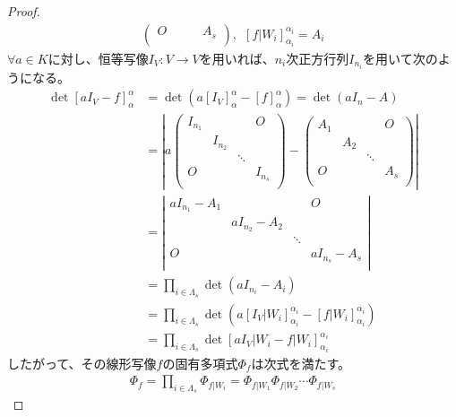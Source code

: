 \documentclass[dvipdfmx]{jsarticle}
\begin{document}
\begin{proof}
\begin{align*}
\begin{pmatrix}
O & \  & \  & A_{s} \\
\end{pmatrix},\ \ \left[ f|W_{i} \right]_{\alpha_{i}}^{\alpha_{i}} = A_{i}
\end{align*}
$\forall a \in K$に対し、恒等写像$I_{V}:V \rightarrow V$を用いれば、$n_{i}$次正方行列$I_{n_{i}}$を用いて次のようになる。
\begin{align*}
\det\left[ aI_{V} - f \right]_{\alpha}^{\alpha} &= \det\left( a\left[ I_{V} \right]_{\alpha}^{\alpha} - [ f]_{\alpha}^{\alpha} \right) = \det\left( aI_{n} - A \right)\\
&= \left| a\begin{pmatrix}
I_{n_{1}} & \  & \  & O \\
\  & I_{n_{2}} & \  & \  \\
\  & \  & \ddots & \  \\
O & \  & \  & I_{n_{s}} \\
\end{pmatrix} - \begin{pmatrix}
A_{1} & \  & \  & O \\
\  & A_{2} & \  & \  \\
\  & \  & \ddots & \  \\
O & \  & \  & A_{s} \\
\end{pmatrix} \right|\\
&= \left| \begin{matrix}
aI_{n_{1}} - A_{1} & \  & \  & O \\
\  & aI_{n_{2}} - A_{2} & \  & \  \\
\  & \  & \ddots & \  \\
O & \  & \  & aI_{n_{s}} - A_{s} \\
\end{matrix} \right|\\
&= \prod_{i \in \varLambda_{s}} {\det\left( aI_{n_{i}} - A_{i} \right)}\\
&= \prod_{i \in \varLambda_{s}} {\det\left( a\left[ I_{V}|W_{i} \right]_{\alpha_{i}}^{\alpha_{i}} - \left[ f|W_{i} \right]_{\alpha_{i}}^{\alpha_{i}} \right)}\\
&= \prod_{i \in \varLambda_{s}} {\det\left[ aI_{V}\left| W_{i} - f \right|W_{i} \right]_{\alpha_{i}}^{\alpha_{i}}}
\end{align*}
したがって、その線形写像$f$の固有多項式$\varPhi_{f}$は次式を満たす。
\begin{align*}
\varPhi_{f} = \prod_{i \in \varLambda_{s}} {\varPhi_{f|W_{i}}} = \varPhi_{f|W_{1}}\varPhi_{f|W_{2}}\cdots\varPhi_{f|W_{s}}
\end{align*}
\end{proof}
\end{document}

